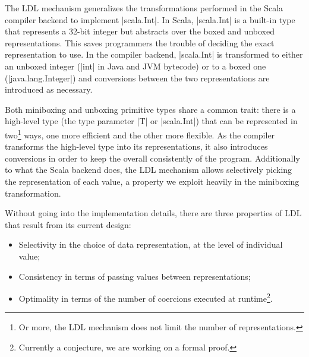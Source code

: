 The LDL mechanism generalizes the transformations performed in the Scala compiler backend to implement |scala.Int|. In Scala, |scala.Int| is a built-in type that represents a 32-bit integer but abstracts over the boxed and unboxed representations. This saves programmers the trouble of deciding the exact representation to use. In the compiler backend, |scala.Int| is transformed to either an unboxed integer (|int| in Java and JVM bytecode) or to a boxed one (|java.lang.Integer|) and conversions between the two representations are introduced as necessary. %


Both miniboxing and unboxing primitive types share a common trait: there is a high-level type (the type parameter |T| or |scala.Int|) that can be represented in two\footnote{Or more, the LDL mechanism does not limit the number of representations.} ways, one more efficient and the other more flexible. As the compiler transforms the high-level type into its representations, it also introduces conversions in order to keep the overall consistently of the program. Additionally to what the Scala backend does, the LDL mechanism allows selectively picking the representation of each value, a property we exploit heavily in the miniboxing transformation.

Without going into the implementation details, there are three properties of LDL that result from its current design:

\begin{itemize}
  \item Selectivity in the choice of data representation, at the level of individual value;
  \item Consistency in terms of passing values between representations; %
  \item Optimality in terms of the number of coercions executed at runtime\footnote{Currently a conjecture, we are working on a formal proof.}.
\end{itemize}

